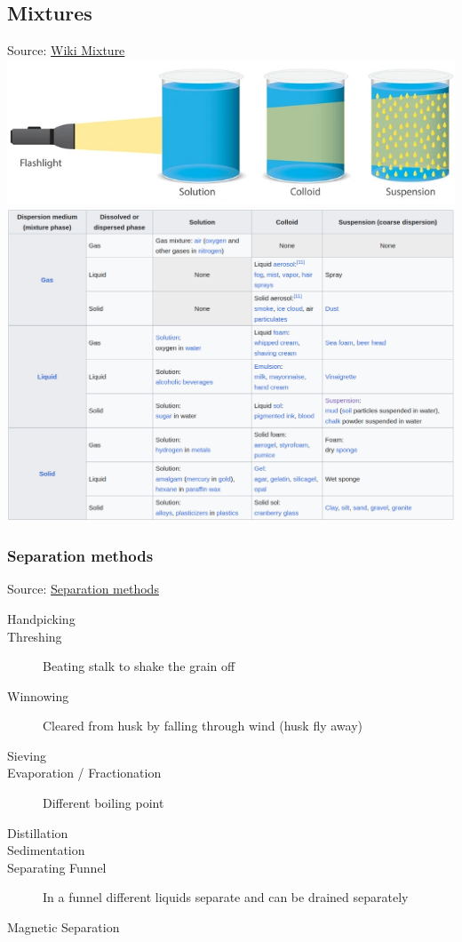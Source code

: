 \subsection{Mixtures}
Source: \href{https://en.wikipedia.org/wiki/Mixture#Homogeneous_and_heterogeneous_mixtures}{Wiki Mixture}
\\
\includegraphics[width=40em]{./includes/chemistry/imgs/colloid.png}\\
\includegraphics[width=\textwidth]{./includes/chemistry/imgs/mixtures.png}

\subsubsection{Separation methods}
Source: \href{https://byjus.com/chemistry/methods-of-separation/}{Separation methods}

\begin{description}
    \item[Handpicking] 
    \item[Threshing] Beating stalk to shake the grain off
    \item[Winnowing] Cleared from husk by falling through wind (husk fly away)
    \item[Sieving]
    \item[Evaporation / Fractionation] Different boiling point 
    \item[Distillation]
    \item[Sedimentation]
    \item[Separating Funnel] In a funnel different liquids separate and can be drained separately 
    \item[Magnetic Separation]
\end{description}

